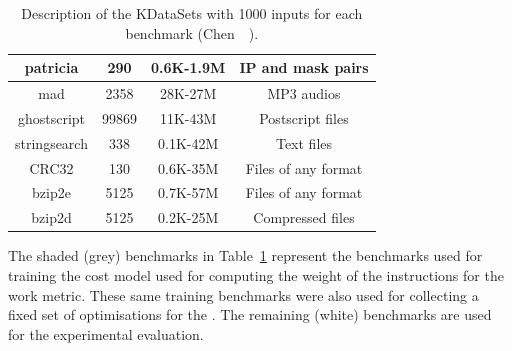 \begin{table}[h]
{\begin{tabular}{|c|c|c|c|}
\rowcolor{gray!20}
patricia      & 290    & 0.6K-1.9M                  & IP and mask pairs              \\ \hline
\rowcolor{gray!20}
mad           & 2358   & 28K-27M                    & MP3 audios                     \\ \hline
\rowcolor{gray!20}
ghostscript   & 99869  & 11K-43M                    & Postscript files               \\ \hline
\rowcolor{gray!20}
stringsearch  & 338    &  0.1K-42M                 &  Text files                     \\ \hline
\rowcolor{gray!20}
CRC32         & 130    & 0.6K-35M                   & Files of any format            \\ \hline
\rowcolor{gray!20}
bzip2e        & 5125   & 0.7K-57M                   & Files of any format            \\ \hline
\rowcolor{gray!20}
bzip2d        & 5125   & 0.2K-25M                   & Compressed files               \\ \hline
\end{tabular}
}
\caption{Description of the KDataSets with 1000 inputs for each benchmark (Chen~\etal~\cite{chen10,chen12a}).}
\label{tab:kdatasets}
\end{table}

The shaded (grey) benchmarks in Table~\ref{tab:kdatasets} represent the benchmarks used for training the cost model used for computing the weight of the instructions for the work metric.
These same training benchmarks were also used for collecting a fixed set of optimisations for the {\itercomp}.
The remaining (white) benchmarks are used for the experimental evaluation.

